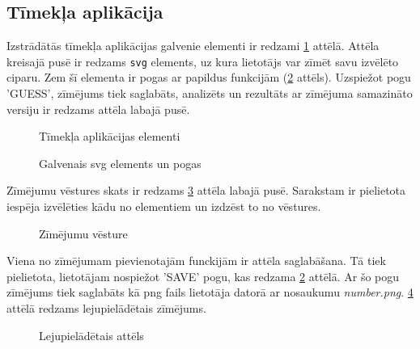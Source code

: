 \subsection{Tīmekļa aplikācija}
Izstrādātās tīmekļa aplikācijas galvenie elementi ir redzami \ref{orig:lapasElementi} attēlā. Attēla kreisajā pusē ir redzams \texttt{svg} elements, uz kura lietotājs var zīmēt savu izvēlēto ciparu. Zem šī elementa ir pogas ar papildus funkcijām (\ref{orig:svgElementi} attēls). Uzspiežot pogu 'GUESS', zīmējums tiek saglabāts, analizēts un rezultāts ar zīmējuma samazināto versiju ir redzams attēla labajā pusē.

\begin{figure}[H]
    \centering
    \caption{Tīmekļa aplikācijas elementi}
    \label{orig:lapasElementi}
\end{figure}

\begin{figure}[H]
    \centering
    \caption{Galvenais svg elements un pogas}
    \label{orig:svgElementi}
\end{figure}

\par Zīmējumu vēstures skats ir redzams \ref{orig:selection} attēla labajā pusē. Sarakstam ir pielietota iespēja izvēlēties kādu no elementiem un izdzēst to no vēstures.

\begin{figure}[H]
    \centering
    \caption{Zīmējumu vēsture}
    \label{orig:selection}
\end{figure}

\par Viena no zīmējumam pievienotajām funckijām ir attēla saglabāšana. Tā tiek pielietota, lietotājam nospiežot 'SAVE' pogu, kas redzama \ref{orig:svgElementi} attēlā. Ar šo pogu zīmējums tiek saglabāts kā png fails lietotāja datorā ar nosaukumu \textit{number.png}. \ref{orig:downloadedFile} attēlā redzams lejupielādētais zīmējums.
\begin{figure}[H]
    \centering
    \caption{Lejupielādētais attēls}
    \label{orig:downloadedFile}
\end{figure}
